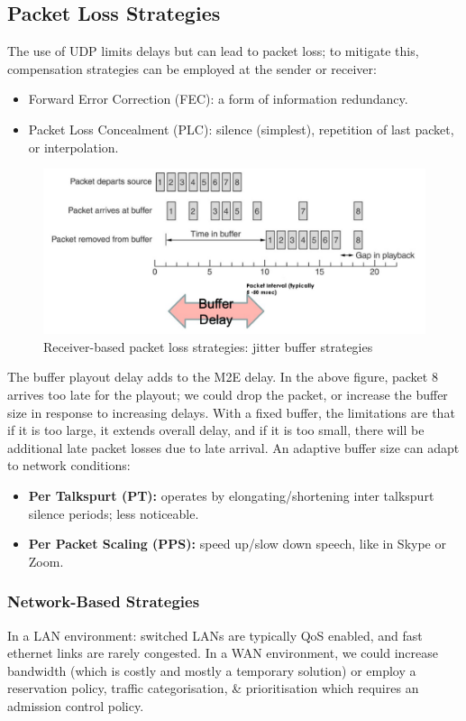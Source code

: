 \documentclass[a4paper,11pt]{article}
\begin{document}
\subsection{Packet Loss Strategies}
The use of UDP limits delays but can lead to packet loss;
to mitigate this, compensation strategies can be employed at the sender or receiver:
\begin{itemize}
    \item   Forward Error Correction (FEC): a form of information redundancy.
    \item   Packet Loss Concealment (PLC): silence (simplest), repetition of last packet, or interpolation.
\end{itemize}

\begin{figure}[H]
    \centering
    \includegraphics[width=\textwidth]{./images/jitterbufferstrat.png}
    \caption{ Receiver-based packet loss strategies: jitter buffer strategies }
\end{figure}

The buffer playout delay adds to the M2E delay.
In the above figure, packet 8 arrives too late for the playout; we could drop the packet, or increase the buffer size in response to increasing delays.
With a fixed buffer, the limitations are that if it is too large, it extends overall delay, and if it is too small, there will be additional late packet losses due to late arrival.
An adaptive buffer size can adapt to network conditions:
\begin{itemize}
    \item   \textbf{Per Talkspurt (PT):} operates by elongating/shortening inter talkspurt silence periods; less noticeable.
    \item   \textbf{Per Packet Scaling (PPS):} speed up/slow down speech, like in Skype or Zoom.
\end{itemize}

\subsubsection{Network-Based Strategies}
In a LAN environment: switched LANs are typically QoS enabled, and fast ethernet links are rarely congested.
In a WAN environment, we could increase bandwidth (which is costly and mostly a temporary solution) or employ a reservation policy, traffic categorisation, \& prioritisation which requires an admission control policy.
\end{document}
